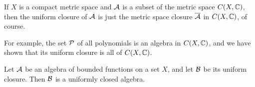 If $X$ is a compact metric space and ${\mathcal{A}}$ is a subset of the metric space
$C(X,{\mathbb{C}})$, then the uniform closure of ${\mathcal{A}}$ is just the metric space closure
$\overline{{\mathcal{A}}}$
in $C(X,{\mathbb{C}})$, of course.

For example, the set ${\mathcal{P}}$ of all polynomials is an algebra in $C(X,{\mathbb{C}})$, and we
have shown that its uniform closure is all of $C(X,{\mathbb{C}})$.


\begin{thm}
Let ${\mathcal{A}}$ be an algebra of bounded functions on a set $X$, and let ${\mathcal{B}}$
be its uniform closure.  Then ${\mathcal{B}}$ is a uniformly closed algebra.
\end{thm}

